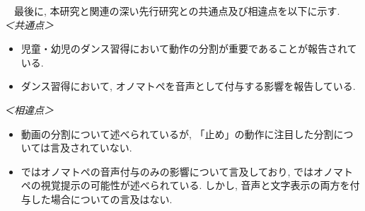\documentclass[paper]{ieicej}
\begin{document}
　最後に, 本研究と関連の深い先行研究との共通点及び相違点を以下に示す. \\
\textit{＜共通点＞}
\begin{itemize}[nosep]
  \item 児童・幼児のダンス習得において動作の分割が重要であることが報告されている. 
  \item ダンス習得において, オノマトペを音声として付与する影響を報告している. 
\end{itemize}
\textit{＜相違点＞}
\begin{itemize}[nosep]
  \item 動画の分割について述べられているが, 「止め」の動作に注目した分割については言及されていない.  
  \item \cite{ref14}ではオノマトペの音声付与のみの影響について言及しており, \cite{ref15}ではオノマトペの視覚提示の可能性が述べられている. しかし, 音声と文字表示の両方を付与した場合についての言及はない. 
\end{itemize}
\end{document}
